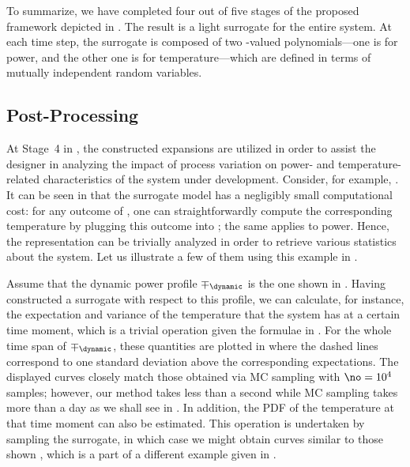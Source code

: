 To summarize, we have completed four out of five stages of the proposed
framework depicted in . The result is a light surrogate for
the entire system. At each time step, the surrogate is composed of two
\np-valued polynomials---one is for power, and the other one is for
temperature---which are defined in terms of \nz mutually independent random
variables.

\subsection{Post-Processing}

At Stage~4 in , the constructed expansions are utilized in
order to assist the designer in analyzing the impact of process variation on
power- and temperature-related characteristics of the system under development.
Consider, for example, . It can be seen in that
the surrogate model has a negligibly small computational cost: for any outcome
of \vz, one can straightforwardly compute the corresponding temperature by
plugging this outcome into ; the same applies to
power. Hence, the representation can be trivially analyzed in order to retrieve
various statistics about the system. Let us illustrate a few of them using this
example in .

Assume that the dynamic power profile $\mp_\dynamic$ is the one shown in
. Having constructed a surrogate with respect to
this profile, we can calculate, for instance, the expectation and variance of
the temperature that the system has at a certain time moment, which is a trivial
operation given the formulae in . For the whole time span of
$\mp_\dynamic$, these quantities are plotted in
 where the dashed lines correspond to one
standard deviation above the corresponding expectations. The displayed curves
closely match those obtained via \ac{MC} sampling with $\no = 10^4$ samples;
however, our method takes less than a second while \ac{MC} sampling takes more
than a day as we shall see in . In addition, the
\ac{PDF} of the temperature at that time moment can also be estimated. This
operation is undertaken by sampling the surrogate, in which case we might obtain
curves similar to those shown , which is a part
of a different example given in .

